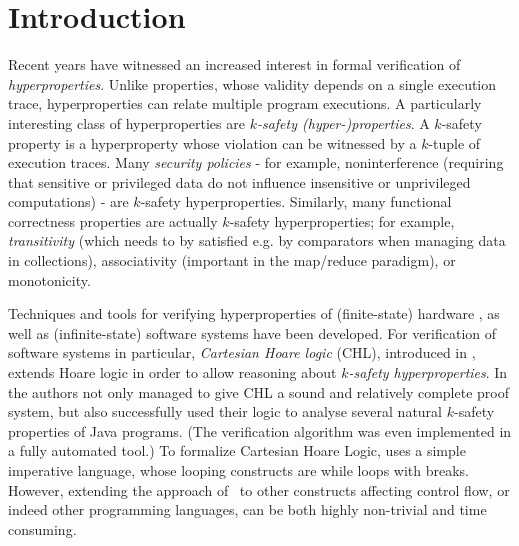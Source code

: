 \section{Introduction}
Recent years have witnessed an increased interest in formal verification of
\emph{hyperproperties}. Unlike properties, whose validity depends on a single
execution trace, hyperproperties can relate multiple program executions. A
particularly interesting class of hyperproperties are \emph{$k$-safety
  (hyper-)properties}. %
A $k$-safety property is a hyperproperty whose violation can be witnessed by a
$k$-tuple of execution traces.  Many \emph{security policies} - for example,
noninterference (requiring that sensitive or privileged data do not influence
insensitive or unprivileged computations) - are $k$-safety hyperproperties.
Similarly, many functional correctness properties are actually $k$-safety
hyperproperties; for example, \emph{transitivity} (which needs to by satisfied
e.g. by comparators when managing data in collections), associativity
(important in the map/reduce paradigm), or monotonicity.


Techniques and tools for verifying hyperproperties of (finite-state) hardware
\cite{CoenenFST19,FinkbeinerRS15}, as well as (infinite-state) software
systems have been developed.  For verification of software systems in
particular, \emph{Cartesian Hoare logic} (CHL), introduced in \cite{SousaD16},
extends Hoare logic in order to allow reasoning about \emph{$k$-safety
  hyperproperties}. In \cite{SousaD16} the authors not only managed to give
CHL a sound and relatively complete proof system, but also successfully used
their logic to analyse several natural $k$-safety properties of Java
programs. (The verification algorithm was even implemented in a fully automated
tool.) To formalize Cartesian Hoare Logic, \cite{SousaD16} uses a simple
imperative language, whose looping constructs are while loops with
breaks. However, extending the approach of~\cite{SousaD16} to
other constructs affecting control flow, or indeed other programming
languages, can be both highly non-trivial and time consuming.



